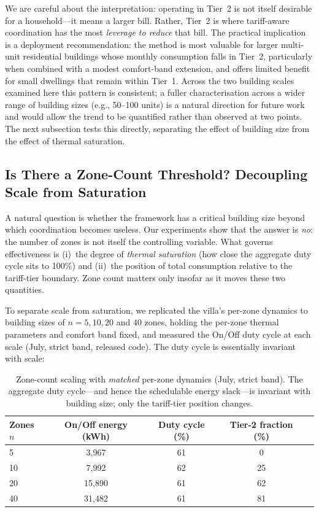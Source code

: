 \documentclass[12pt,a4paper]{article}
\begin{document}
We are careful about the interpretation: operating in Tier~2 is not itself desirable for a household---it means a larger bill. Rather, Tier~2 is where tariff-aware coordination has the most \emph{leverage to reduce} that bill. The practical implication is a deployment recommendation: the method is most valuable for larger multi-unit residential buildings whose monthly consumption falls in Tier~2, particularly when combined with a modest comfort-band extension, and offers limited benefit for small dwellings that remain within Tier~1. Across the two building scales examined here this pattern is consistent; a fuller characterisation across a wider range of building sizes (e.g., 50--100 units) is a natural direction for future work and would allow the trend to be quantified rather than observed at two points. The next subsection tests this directly, separating the effect of building size from the effect of thermal saturation.


\subsection{Is There a Zone-Count Threshold? Decoupling Scale from Saturation}
\label{sec:threshold}
A natural question is whether the framework has a critical building size beyond which coordination becomes useless. Our experiments show that the answer is \emph{no}: the number of zones is not itself the controlling variable. What governs effectiveness is (i)~the degree of \emph{thermal saturation} (how close the aggregate duty cycle sits to 100\%) and (ii)~the position of total consumption relative to the tariff-tier boundary. Zone count matters only insofar as it moves these two quantities.

To separate scale from saturation, we replicated the villa's per-zone dynamics to building sizes of $n = 5, 10, 20$ and $40$ zones, holding the per-zone thermal parameters and comfort band fixed, and measured the On/Off duty cycle at each scale (July, strict band, released code). The duty cycle is essentially invariant with scale:

\begin{table}[H]
\centering
\caption{Zone-count scaling with \emph{matched} per-zone dynamics (July, strict band). The aggregate duty cycle---and hence the schedulable energy slack---is invariant with building size; only the tariff-tier position changes.}
\label{tab:threshold}
\begin{tabular*}{\textwidth}{@{\extracolsep{\fill}}lcccc@{}}
\toprule
\textbf{Zones} $n$ & \textbf{On/Off energy} (kWh) & \textbf{Duty cycle} (\%) & \textbf{Tier-2 fraction} (\%) \\
\midrule
5  & 3{,}967  & 61 & 0  \\
10 & 7{,}992  & 62 & 25 \\
20 & 15{,}890 & 61 & 62 \\
40 & 31{,}482 & 61 & 81 \\
\bottomrule
\end{tabular*}
\end{table}
\end{document}
